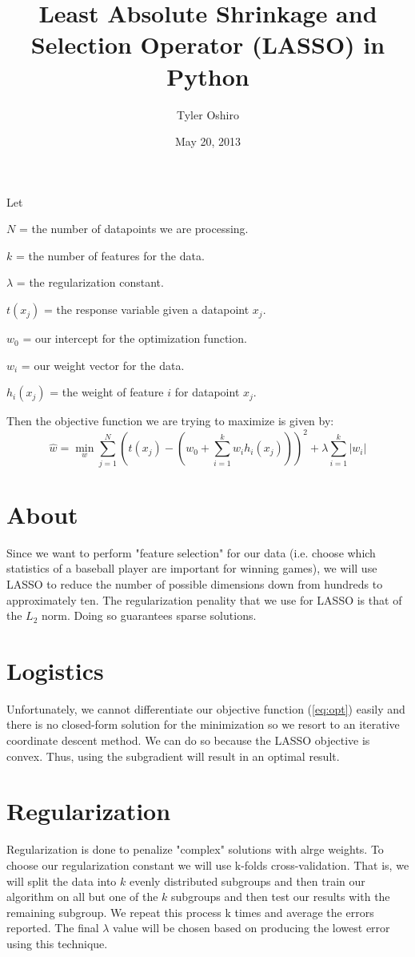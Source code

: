 \documentclass{article}
\title{Least Absolute Shrinkage and Selection Operator (LASSO) in Python}
\author{Tyler Oshiro}
\date{May 20, 2013}
\begin{document}
\maketitle
\tableofcontents


\begin{description}
\item Let
\item $N$ = the number of datapoints we are processing.
\item $k$ = the number of features for the data.
\item $\lambda$ = the regularization constant.
\item $t({x_j})$ = the response variable given a datapoint ${x_j}$.
\item ${w_0}$ = our intercept for the optimization function.
\item ${w_i}$ = our weight vector for the data.
\item ${h_i}({x_j})$ = the weight of feature $i$ for datapoint ${x_j}$.
\end{description}
Then the objective function we are trying to maximize is given by:
\begin{equation}\label{eq:opt}
{\hat{w}} = \min\limits_{w} \sum_{j=1}^{N} \left(t\left({x_j}\right) - ({w_0} + \sum_{i=1}^{k} {w_i}{h_i}({x_j}))\right)^2 + \lambda\sum_{i=1}^{k} |{w_i}|
\end{equation}
\newpage
\section{About}
\label{About}
Since we want to perform "feature selection" for our data (i.e. choose which statistics of a baseball player are important for winning games), we will use LASSO to reduce the number of possible dimensions down from hundreds to approximately ten. The regularization penality that we use for LASSO is that of the ${L_2}$ norm. Doing so guarantees sparse solutions.
\section{Logistics}
\label{Logistics}
Unfortunately, we cannot differentiate our objective function (\ref{eq:opt}) easily and there is no closed-form solution for the minimization so we resort to an iterative coordinate descent method. We can do so because the LASSO objective is convex. Thus, using the subgradient will result in an optimal result.
\section{Regularization}
\label{Regularization}
Regularization is done to penalize "complex" solutions with alrge weights. To choose our regularization constant we will use k-folds cross-validation. That is, we will split the data into $k$ evenly distributed subgroups and then train our algorithm on all but one of the $k$ subgroups and then test our results with the remaining subgroup. We repeat this process k times and average the errors reported. The final $\lambda$ value will be chosen based on producing the lowest error using this technique.
\end{document}
